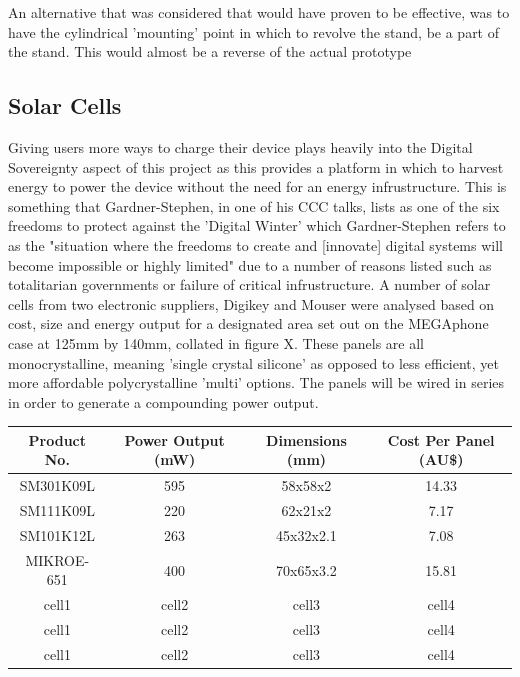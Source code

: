 An alternative that was considered that would have proven to be effective, was to have the cylindrical 'mounting' point in which to revolve the stand, be a part of the stand.
This would almost be a reverse of the actual prototype


\subsection{Solar Cells}

Giving users more ways to charge their device plays heavily into the Digital Sovereignty aspect of this project as this provides a platform in which to harvest energy to power the device without the need for an energy infrustructure.
This is something that Gardner-Stephen, in one of his CCC talks, lists as one of the six freedoms to protect against the 'Digital Winter' which Gardner-Stephen refers to as the "situation where the freedoms to create and [innovate] digital systems will become impossible or highly limited" due to a number of reasons listed such as totalitarian governments or failure of critical infrustructure\cite{freedoms}.
A number of solar cells from two electronic suppliers, Digikey and Mouser were analysed based on cost, size and energy output for a designated area set out on the MEGAphone case at 125mm by 140mm, collated in figure X. %
These panels are all monocrystalline, meaning 'single crystal silicone' as opposed to less efficient, yet more affordable polycrystalline 'multi' options.
The panels will be wired in series in order to generate a compounding power output.

\begin{center}
    \begin{tabular}{ |c|c|c|c| }
    \hline
    Product No. & Power Output (mW) & Dimensions (mm) & Cost Per Panel (AU\$) \\
    \hline
    SM301K09L & 595 & 58x58x2 & 14.33 \\
    \hline
    SM111K09L & 220 & 62x21x2 & 7.17 \\ 
    \hline
    SM101K12L & 263 & 45x32x2.1 & 7.08 \\
    \hline
    MIKROE-651 & 400 & 70x65x3.2 & 15.81 \\
    \hline
    cell1 & cell2 & cell3 & cell4 \\
    \hline
    cell1 & cell2 & cell3 & cell4 \\
    \hline
    cell1 & cell2 & cell3 & cell4 \\
    \hline
    \end{tabular}
\end{center}

